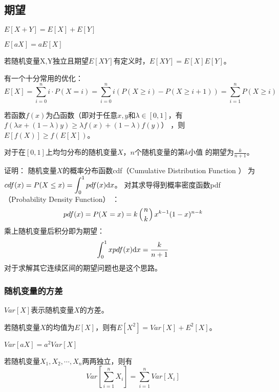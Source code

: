 \subsection{期望}
\begin{theorem}[期望的线性性质]
    $E[X+Y]=E[X]+E[Y]$
\end{theorem}
\begin{theorem}
    $E[aX]=aE[X]$
\end{theorem}
\begin{theorem}
    若随机变量X,Y独立且期望$E[XY]$有定义时，$E[XY]=E[X]E[Y]$。
\end{theorem}
有一个十分常用的优化：
\begin{displaymath}
    E[X]=\sum_{i=0}^n{i\cdot P(X=i)}
    =\sum_{i=0}^n{i(P(X\geq i)-P(X\geq i+1))}
    =\sum_{i=1}^n{P(X\geq i)}
\end{displaymath}
\begin{theorem}
    若函数$f(x)$为凸函数（即对于任意$x,y$和$\lambda\in [0,1]$，有
    $f(\lambda x+(1-\lambda)y)\geq\lambda f(x)+(1-\lambda)f(y)$）
    ，则$E[f(X)]\geq f(E[X])$。
\end{theorem}
\begin{theorem}
    对于在$[0,1]$上均匀分布的随机变量$X$，$n$个随机变量的第$k$小值
    的期望为$\frac{k}{n+1}$。
\end{theorem}
证明：
随机变量$X$的概率分布函数cdf（Cumulative Distribution Function
）
为$\displaystyle cdf(x)=P(X\leq x)=\int_0^1{pdf(x)\mathrm{d} x}$。
对其求导得到概率密度函数pdf（Probability Density Function）
：
\begin{displaymath}
    pdf(x)=P(X=x)=k\left(n \atop k\right)x^{k-1}(1-x)^{n-k}
\end{displaymath}
乘上随机变量后积分即为期望：
\begin{displaymath}
    \int_0^1{xpdf(x)\mathrm{d} x}=\frac{k}{n+1}
\end{displaymath}
对于求解其它连续区间的期望问题也是这个思路。
\subsubsection{随机变量的方差}
$Var[X]$表示随机变量$X$的方差。
\begin{theorem}
    若随机变量$X$的均值为$E[X]$，则有$E[X^2]=Var[X]+E^2[X]$。
\end{theorem}
\begin{theorem}
    $Var[aX]=a^2Var[X]$
\end{theorem}
\begin{theorem}
    若随机变量$X_1,X_2,\cdots,X_n$两两独立，则有
    \begin{displaymath}
        Var[\sum_{i=1}^n{X_i}]=\sum_{i=1}^n{Var[X_i]}
    \end{displaymath}
\end{theorem}
